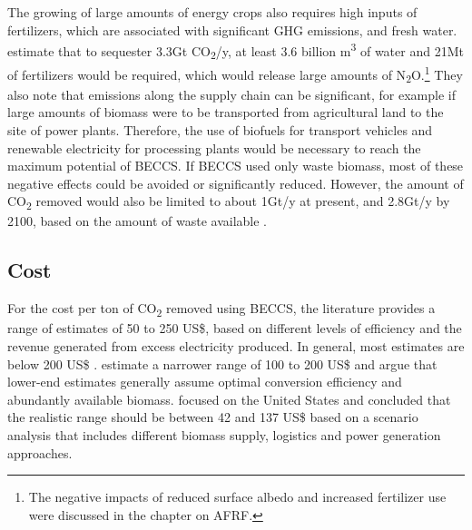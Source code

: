The growing of large amounts of energy crops also requires high inputs of fertilizers, which are associated with significant GHG emissions, and fresh water. \textcite{Fajardy2017CanEmissions} estimate that to sequester 3.3Gt CO\textsubscript{2}/y, at least 3.6 billion m\textsuperscript{3} of water and 21Mt of fertilizers would be required, which would release large amounts of N\textsubscript{2}O.\footnote{The negative impacts of reduced surface albedo and increased fertilizer use were discussed in the chapter on AFRF.} They also note that emissions along the supply chain can be significant, for example if large amounts of biomass were to be transported from agricultural land to the site of power plants. Therefore, the use of biofuels for transport vehicles and renewable electricity for processing plants would be necessary to reach the maximum potential of BECCS.
If BECCS used only waste biomass, most of these negative effects could be avoided or significantly reduced. However, the amount of CO\textsubscript{2} removed would also be limited to about 1Gt/y at present, and 2.8Gt/y by 2100, based on the amount of waste available \parencite{Pour2018PotentialBECCS}.
\subsection*{Cost}
For the cost per ton of CO\textsubscript{2} removed using BECCS, the literature provides a range of estimates of 50 to 250 US\$, based on different levels of efficiency and the revenue generated from excess electricity produced. In general, most estimates are below 200 US\$ \parencite[343]{IPCC2018Global1.5C}. \textcite{Fuss2018NegativeEffects} estimate a narrower range of 100 to 200 US\$ and argue that lower-end estimates generally assume optimal conversion efficiency and abundantly available biomass. \textcite{Langholtz2020TheUS} focused on the United States and concluded that the realistic range should be between 42 and 137 US\$ based on a scenario analysis that includes different biomass supply, logistics and power generation approaches.

